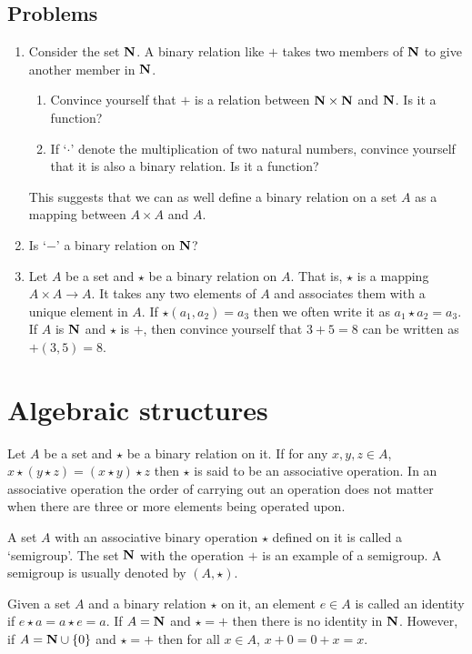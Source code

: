 \subsection{Problems}
\begin{enumerate}
\item Consider the set $\mathbf{N}$. A binary relation like $+$ takes two members of
$\mathbf{N}$ to give another member in $\mathbf{N}$. 
\begin{enumerate}
\item Convince yourself that $+$ is a relation between $\mathbf{N} \times \mathbf{N}$ and
$\mathbf{N}$. Is it a function?
\item If `$\cdot$' denote the multiplication of two natural numbers, convince 
yourself that it is also a binary relation. Is it a function?
\end{enumerate}
This suggests that we can as well define a binary relation on a set $A$ as a 
mapping between $A \times A$ and $A$.
\item Is `$-$' a binary relation on $\mathbf{N}$?
\item Let $A$ be a set and $\star$ be a binary relation on $A$. That is, 
$\star$ is a mapping $A \times A \rightarrow A$. It takes any two elements of 
$A$ and associates them with a unique element in $A$. If $\star(a_1, a_2) = 
a_3$ then we often write it as $a_1 \star a_2 = a_3$. If $A$ is $\mathbf{N}$ and
$\star$ is $+$, then convince yourself that $3 + 5 = 8$ can be written as 
$+(3, 5) = 8$.
\end{enumerate}

\section{Algebraic structures}\label{c1s5}
Let $A$ be a set and $\star$ be a binary relation on it. If for any $x, y, z
\in A$, $x \star (y \star z) = (x \star y) \star z$ then $\star$ is said to be
an associative operation. In an associative operation the order of carrying out
an operation does not matter when there are three or more elements being 
operated upon.

A set $A$ with an associative binary operation $\star$ defined on it is called
a `semigroup'. The set $\mathbf{N}$ with the operation $+$ is an example of a 
semigroup. A semigroup is usually denoted by $(A, \star)$.

Given a set $A$ and a binary relation $\star$ on it, an element $e \in A$ is 
called an identity if $e \star a = a \star e = a$. If $A = \mathbf{N}$ and $\star =
+$ then there is no identity in $\mathbf{N}$. However, if $A = \mathbf{N} \cup \{0\}$ and
$\star = +$ then for all $x \in A$, $x + 0 = 0 + x = x$.


